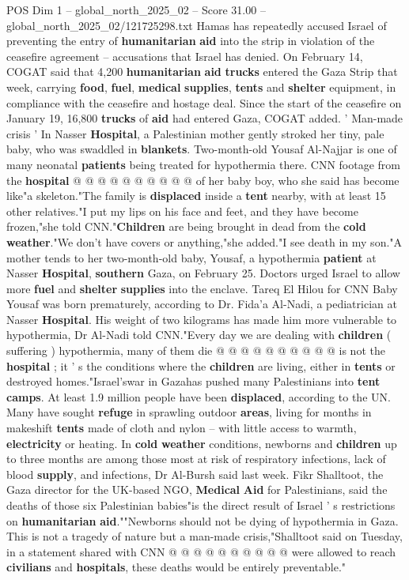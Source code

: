 \begin{textsample}{POS Dim 1 – global\_north\_2025\_02 – Score 31.00 – global\_north\_2025\_02/121725298.txt}
Hamas has repeatedly accused Israel of preventing the entry of \textbf{humanitarian} \textbf{aid} into the strip in violation of the ceasefire agreement -- accusations that Israel has denied.
On February 14, COGAT said that 4,200 \textbf{humanitarian} \textbf{aid} \textbf{trucks} entered the Gaza Strip that week, carrying \textbf{food}, \textbf{fuel}, \textbf{medical} \textbf{supplies}, \textbf{tents} and \textbf{shelter} equipment, in compliance with the ceasefire and hostage deal.
Since the start of the ceasefire on January 19, 16,800 \textbf{trucks} of \textbf{aid} had entered Gaza, COGAT added. ' Man-made crisis ' In Nasser \textbf{Hospital}, a Palestinian mother gently stroked her tiny, pale baby, who was swaddled in \textbf{blankets}.
Two-month-old Yousaf Al-Najjar is one of many neonatal \textbf{patients} being treated for hypothermia there.
CNN footage from the \textbf{hospital} @ @ @ @ @ @ @ @ @ @ of her baby boy, who she said has become like"a skeleton."The family is \textbf{displaced} inside a \textbf{tent} nearby, with at least 15 other relatives."I put my lips on his face and feet, and they have become frozen,"she told CNN."\textbf{Children} are being brought in dead from the \textbf{cold} \textbf{weather}."We don't have covers or anything,"she added."I see death in my son."A mother tends to her two-month-old baby, Yousaf, a hypothermia \textbf{patient} at Nasser \textbf{Hospital}, \textbf{southern} Gaza, on February 25.
Doctors urged Israel to allow more \textbf{fuel} and \textbf{shelter} \textbf{supplies} into the enclave.
Tareq El Hilou for CNN Baby Yousaf was born prematurely, according to Dr.
Fida'a Al-Nadi, a pediatrician at Nasser \textbf{Hospital}.
His weight of two kilograms has made him more vulnerable to hypothermia, Dr Al-Nadi told CNN."Every day we are dealing with \textbf{children} ( suffering ) hypothermia, many of them die @ @ @ @ @ @ @ @ @ @ is not the \textbf{hospital} ; it ' s the conditions where the \textbf{children} are living, either in \textbf{tents} or destroyed homes."Israel'swar in Gazahas pushed many Palestinians into \textbf{tent} \textbf{camps}.
At least 1.9 million people have been \textbf{displaced}, according to the UN.
Many have sought \textbf{refuge} in sprawling outdoor \textbf{areas}, living for months in makeshift \textbf{tents} made of cloth and nylon -- with little access to warmth, \textbf{electricity} or heating.
In \textbf{cold} \textbf{weather} conditions, newborns and \textbf{children} up to three months are among those most at risk of respiratory infections, lack of blood \textbf{supply}, and infections, Dr Al-Bursh said last week.
Fikr Shalltoot, the Gaza director for the UK-based NGO, \textbf{Medical} \textbf{Aid} for Palestinians, said the deaths of those six Palestinian babies"is the direct result of Israel ' s restrictions on \textbf{humanitarian} \textbf{aid}.""Newborns should not be dying of hypothermia in Gaza.
This is not a tragedy of nature but a man-made crisis,"Shalltoot said on Tuesday, in a statement shared with CNN @ @ @ @ @ @ @ @ @ @ were allowed to reach \textbf{civilians} and \textbf{hospitals}, these deaths would be entirely preventable."


\end{textsample}
